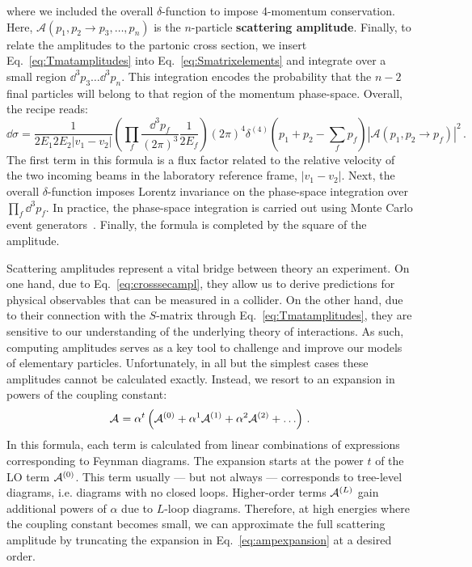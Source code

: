 \documentclass[main.tex]{subfiles}
\begin{document}
where we included the overall $\delta$-function to impose 4-momentum conservation. Here, $\mathcal{A} (p_1,p_2 \rightarrow p_3, \ldots, p_n)$ is the $n$-particle \textbf{scattering amplitude}. Finally, to relate the amplitudes to the partonic cross section, we insert Eq.~\ref{eq:Tmatamplitudes} into Eq.~\ref{eq:Smatrixelements} and integrate over a small region $\dd^3p_3 \ldots \dd^3 p_n$. This integration encodes the probability that the $n-2$ final particles will belong to that region of the momentum phase-space. Overall, the recipe reads:
\begin{equation} \label{eq:crosssecampl}
    \dd \hat{\sigma} = \frac{1}{2E_1 2E_2 |v_1-v_2|} \left(\prod_f \frac{\dd^3 p_f}{(2\pi)^3} \frac{1}{2E_f} \right) (2\pi)^4 \delta^{(4)}\left(p_1+p_2 - \sum_f p_f\right)|\mathcal{A}(p_1,p_2 \rightarrow p_f)|^2\,.
\end{equation}
The first term in this formula is a flux factor related to the relative velocity of the two incoming beams in the laboratory reference frame, $|v_1-v_2|$. Next, the overall $\delta$-function imposes Lorentz invariance on the phase-space integration over $\prod_f \dd^3 p_f$. In practice, the phase-space integration is carried out using Monte Carlo event generators~\cite{Reuschle:2014fya, Campbell:2022qmc}. Finally, the formula is completed by the square of the amplitude.

Scattering amplitudes represent a vital bridge between theory an experiment. On one hand, due to Eq.~\ref{eq:crosssecampl}, they allow us to derive predictions for physical observables that can be measured in a collider. On the other hand, due to their connection with the $S$-matrix through Eq.~\ref{eq:Tmatamplitudes}, they are sensitive to our understanding of the underlying theory of interactions. As such, computing amplitudes serves as a key tool to challenge and improve our models of elementary particles. Unfortunately, in all but the simplest cases these amplitudes cannot be calculated exactly. Instead, we resort to an expansion in powers of the coupling constant:
\begin{equation} \label{eq:ampexpansion}
    \mathcal{A}_{}^{} = \alpha^t \left(\mathcal{A}_{}^{(0)} + \alpha^1 \mathcal{A}_{}^{(1)} + \alpha^2 \mathcal{A}_{}^{(2)} + \ldots \right) \,.
\end{equation}
In this formula, each term is calculated from linear combinations of expressions corresponding to Feynman diagrams. The expansion starts at the power $t$ of the LO term $\mathcal{A}_{}^{(0)}$. This term usually --- but not always --- corresponds to tree-level diagrams, i.e. diagrams with no closed loops. Higher-order terms $\mathcal{A}_{}^{(L)}$ gain additional powers of $\alpha$ due to $L$-loop diagrams. Therefore, at high energies where the coupling constant becomes small, we can approximate the full scattering amplitude by truncating the expansion in Eq.~\ref{eq:ampexpansion} at a desired order.
\end{document}
